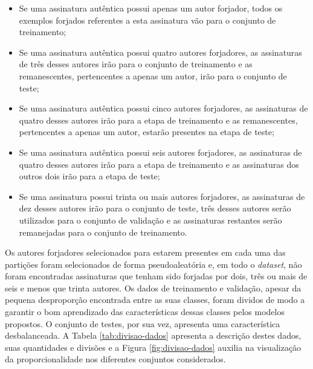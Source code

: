 \begin{itemize}
	\item Se uma assinatura autêntica possui apenas um autor forjador, todos os exemplos forjados referentes a esta assinatura vão para o conjunto de treinamento;
	\item Se uma assinatura autêntica possui quatro autores forjadores, as assinaturas de três desses autores irão para o conjunto de treinamento e as remanescentes, pertencentes a apenas um autor, irão para o conjunto de teste;
	\item Se uma assinatura autêntica possui cinco autores forjadores, as assinaturas de quatro desses autores irão para a etapa de treinamento e as remanescentes, pertencentes a apenas um autor, estarão presentes na etapa de teste;
	\item Se uma assinatura autêntica possui seis autores forjadores, as assinaturas de quatro desses autores irão para a etapa de treinamento e as assinaturas dos outros dois irão para a etapa de teste;
	\item Se uma assinatura possui trinta ou mais autores forjadores, as assinaturas de dez desses autores irão para o conjunto de teste, três desses autores serão utilizados para o conjunto de validação e as assinaturas restantes serão remanejadas para o conjunto de treinamento.
\end{itemize}

Os autores forjadores selecionados para estarem presentes em cada uma das partições foram selecionados de forma pseudoaleatória e, em todo o \emph{dataset}, não foram encontradas assinaturas que tenham sido forjadas por dois, três ou mais de seis e menos que trinta autores. Os dados de treinamento e validação, apesar da pequena desproporção encontrada entre as suas classes, foram dividos de modo a garantir o bom aprendizado das características dessas classes pelos modelos propostos. O conjunto de testes, por sua vez, apresenta uma característica desbalanceada. A Tabela \ref{tab:divisao-dados} apresenta a descrição destes dados, suas quantidades e divisões e a Figura \ref{fig:divisao-dados} auxilia na visualização da proporcionalidade nos diferentes conjuntos considerados.

